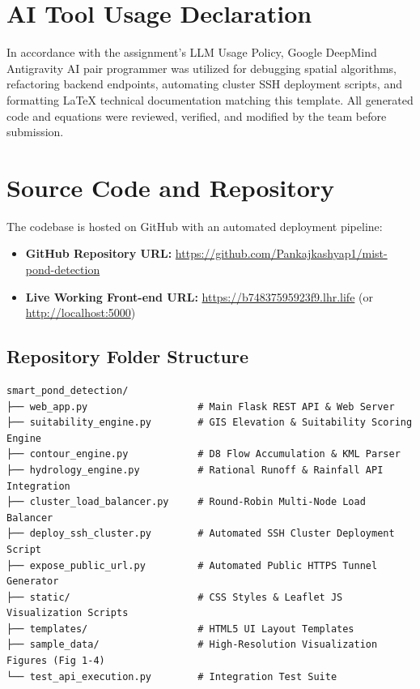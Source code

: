 \documentclass[manuscript,screen,review]{acmart}
\begin{document}
\section{AI Tool Usage Declaration}
\label{sec:ai-usage}
In accordance with the assignment's LLM Usage Policy, Google DeepMind Antigravity AI pair programmer was utilized for debugging spatial algorithms, refactoring backend endpoints, automating cluster SSH deployment scripts, and formatting LaTeX technical documentation matching this template. All generated code and equations were reviewed, verified, and modified by the team before submission.

\appendix

\section{Source Code and Repository}
\label{sec:appendix}
The codebase is hosted on GitHub with an automated deployment pipeline:
\begin{itemize}
    \item \textbf{GitHub Repository URL:} \url{https://github.com/Pankajkashyap1/mist-pond-detection}
    \item \textbf{Live Working Front-end URL:} \url{https://b74837595923f9.lhr.life} (or \url{http://localhost:5000})
\end{itemize}

\subsection{Repository Folder Structure}
\begin{verbatim}
smart_pond_detection/
├── web_app.py                   # Main Flask REST API & Web Server
├── suitability_engine.py        # GIS Elevation & Suitability Scoring Engine
├── contour_engine.py            # D8 Flow Accumulation & KML Parser
├── hydrology_engine.py          # Rational Runoff & Rainfall API Integration
├── cluster_load_balancer.py     # Round-Robin Multi-Node Load Balancer
├── deploy_ssh_cluster.py        # Automated SSH Cluster Deployment Script
├── expose_public_url.py         # Automated Public HTTPS Tunnel Generator
├── static/                      # CSS Styles & Leaflet JS Visualization Scripts
├── templates/                   # HTML5 UI Layout Templates
├── sample_data/                 # High-Resolution Visualization Figures (Fig 1-4)
└── test_api_execution.py        # Integration Test Suite
\end{verbatim}
\end{document}
